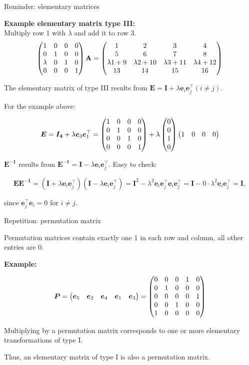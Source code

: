 \documentclass[11pt,compress,t,notes=noshow, xcolor=table]{beamer}
\begin{document}
\begin{vbframe}{Reminder: elementary matrices}
\lz

\textbf{Example elementary matrix type III:}\\
Multiply row 1 with $\lambda$ and add it to row 3.
$$
\begin{pmatrix}  1 & 0 & 0 & 0 \\
      0 & 1 & 0 & 0 \\
      \lambda & 0 & 1 & 0 \\
      0 & 0 & 0 & 1  \end{pmatrix}
\mathbf{A}
= \begin{pmatrix} 1 & 2 & 3 & 4 \\ 5 & 6 & 7 & 8 \\
       \lambda 1+9 & \lambda 2+10 & \lambda 3+11 & \lambda 4+12 \\ 13 & 14 & 15 & 16 \end{pmatrix}
$$

\framebreak

The elementary matrix of type III results from
$\bm{E} = \bm{I} + \lambda \bm{e}_i \bm{e}^{\top}_j (i \not= j)$.

For the example above:

$$
  \bm{E} = \bm{I_4} + \lambda \bm{e}_3 \bm{e}^{\top}_1
         = \begin{pmatrix}  1 & 0 & 0 & 0 \\ 0 & 1 & 0 & 0 \\ 0 & 0 & 1 & 0 \\ 0 & 0 & 0 & 1  \end{pmatrix} +
           \lambda \begin{pmatrix} 0 \\ 0 \\ 1 \\ 0 \end{pmatrix} \begin{pmatrix} 1 & 0 & 0 & 0 \end{pmatrix}
$$

\lz

$\bm{E^{-1}}$ results from $\bm{E^{-1}} = \bm{I} - \lambda \bm{e}_i \bm{e}^{\top}_j$. Easy to check:

$$
  \bm{E E^{-1}} = (\bm{I} + \lambda \bm{e}_i \bm{e}^{\top}_j) (\bm{I} - \lambda \bm{e}_i \bm{e}^{\top}_j)
                = \bm{I}^2 - \lambda^2 \bm{e}_i \bm{e}^{\top}_j \bm{e}_i \bm{e}^{\top}_j
                = \bm{I} - 0 \cdot \lambda^2 \bm{e}_i \bm{e}^{\top}_j
                = \bm{I},
$$

since $\bm{e}^{\top}_j \bm{e}_i = 0$ for $i \neq j$.

\end{vbframe}

\begin{vbframe}{Repetition: permutation matrix}

Permutation matrices contain exactly one 1 in each row and column,
all other entries are 0. 
\lz

\textbf{Example:}

$$
  \bm{P} = \begin{pmatrix} \bm{e}_5 & \bm{e}_2 & \bm{e}_4 & \bm{e}_1 & \bm{e}_3 \end{pmatrix}
         = \begin{pmatrix} 0 & 0 & 0 & 1 & 0 \\
                0 & 1 & 0 & 0 & 0 \\
                0 & 0 & 0 & 0 & 1 \\
                0 & 0 & 1 & 0 & 0 \\
                1 & 0 & 0 & 0 & 0 \end{pmatrix}
$$

Multiplying by a permutation matrix corresponds to one or more elementary transformations of type I.

Thus, an elementary matrix of type I is also a permutation matrix.

\end{vbframe}
\end{document}
